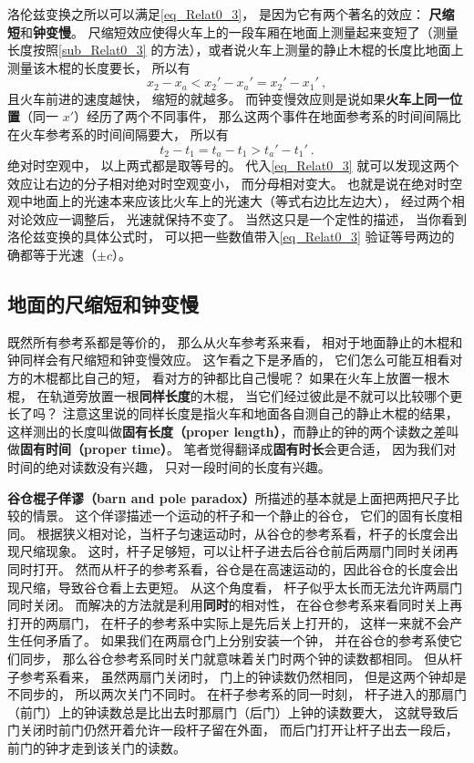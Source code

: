洛伦兹变换之所以可以满足\autoref{eq_Relat0_3}， 是因为它有两个著名的效应： \textbf{尺缩短}和\textbf{钟变慢}。 尺缩短效应使得火车上的一段车厢在地面上测量起来变短了（测量长度按照\autoref{sub_Relat0_3} 的方法），或者说火车上测量的静止木棍的长度比地面上测量该木棍的长度要长， 所以有
\begin{equation}
x_2 - x_a < x_2'-x_a' = x_2' - x_1'~,
\end{equation}
且火车前进的速度越快， 缩短的就越多。 而钟变慢效应则是说如果\textbf{火车上同一位置}（同一 $x'$）经历了两个不同事件， 那么这两个事件在地面参考系的时间间隔比在火车参考系的时间间隔要大， 所以有
\begin{equation}
t_2 - t_1 = t_a - t_1 > t_a' - t_1'~.
\end{equation}
绝对时空观中， 以上两式都是取等号的。 代入\autoref{eq_Relat0_3} 就可以发现这两个效应让右边的分子相对绝对时空观变小， 而分母相对变大。 也就是说在绝对时空观中地面上的光速本来应该比火车上的光速大（等式右边比左边大）， 经过两个相对论效应一调整后， 光速就保持不变了。 当然这只是一个定性的描述， 当你看到洛伦兹变换的具体公式时， 可以把一些数值带入\autoref{eq_Relat0_3} 验证等号两边的确都等于光速（$\pm c$）。

\subsection{地面的尺缩短和钟变慢}
既然所有参考系都是等价的， 那么从火车参考系来看， 相对于地面静止的木棍和钟同样会有尺缩短和钟变慢效应。 这乍看之下是矛盾的， 它们怎么可能互相看对方的木棍都比自己的短， 看对方的钟都比自己慢呢？ 如果在火车上放置一根木棍， 在轨道旁放置一根\textbf{同样长度}的木棍， 当它们经过彼此是不就可以比较哪个更长了吗？ 注意这里说的同样长度是指火车和地面各自测自己的静止木棍的结果， 这样测出的长度叫做\textbf{固有长度（proper length）}，而静止的钟的两个读数之差叫做\textbf{固有时间（proper time）}。 笔者觉得翻译成\textbf{固有时长}会更合适， 因为我们对时间的绝对读数没有兴趣， 只对一段时间的长度有兴趣。

\textbf{谷仓棍子佯谬（barn and pole paradox）}所描述的基本就是上面把两把尺子比较的情景。 这个佯谬描述一个运动的杆子和一个静止的谷仓， 它们的固有长度相同。 根据狭义相对论，当杆子匀速运动时，从谷仓的参考系看，杆子的长度会出现尺缩现象。 这时，杆子足够短，可以让杆子进去后谷仓前后两扇门同时关闭再同时打开。 然而从杆子的参考系看，谷仓是在高速运动的，因此谷仓的长度会出现尺缩，导致谷仓看上去更短。 从这个角度看， 杆子似乎太长而无法允许两扇门同时关闭。 而解决的方法就是利用\textbf{同时}的相对性， 在谷仓参考系来看同时关上再打开的两扇门， 在杆子的参考系中实际上是先后关上打开的， 这样一来就不会产生任何矛盾了。 如果我们在两扇仓门上分别安装一个钟， 并在谷仓的参考系使它们同步， 那么谷仓参考系同时关门就意味着关门时两个钟的读数都相同。 但从杆子参考系看来， 虽然两扇门关闭时， 门上的钟读数仍然相同， 但是这两个钟却是不同步的， 所以两次关门不同时。 在杆子参考系的同一时刻， 杆子进入的那扇门（前门）上的钟读数总是比出去时那扇门（后门）上钟的读数要大， 这就导致后门关闭时前门仍然开着允许一段杆子留在外面， 而后门打开让杆子出去一段后， 前门的钟才走到该关门的读数。

